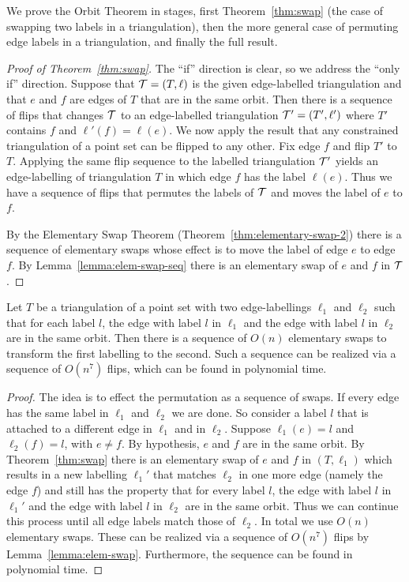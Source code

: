 We prove the Orbit Theorem in stages, first Theorem~\ref{thm:swap} (the case of swapping two labels in a triangulation),
then the more general case of permuting edge labels in a triangulation, and finally the full result.

\begin{proof}[Proof of Theorem~\ref{thm:swap}] 
The ``if'' direction is clear, so we address the ``only if'' direction.
Suppose that ${\cal T} = (T, \ell)$ is the given edge-labelled triangulation and that 
$e$ and $f$ are edges of $T$ that are in the same orbit.  
Then
there is a sequence of flips that changes ${\cal T}$ to an edge-labelled triangulation ${\cal T}' = (T', \ell')$ where $T'$  contains $f$ and $\ell'(f) = \ell(e)$.  
We now apply the result that any constrained triangulation of a point set can be flipped to any other.
Fix edge $f$ and flip $T'$ to $T$.  
Applying the same flip sequence to the labelled triangulation ${\cal T}'$ yields an edge-labelling of triangulation $T$ in which edge $f$ has the label $\ell(e)$.  Thus we have a sequence of flips that permutes the labels of $\cal T$ and moves the label of $e$ to $f$.

By the Elementary Swap Theorem (Theorem~\ref{thm:elementary-swap-2}) there is a sequence of elementary swaps whose effect is to move the label of edge $e$ to edge $f$.  
By Lemma~\ref{lemma:elem-swap-seq} there is an elementary swap of $e$ and $f$ in $\cal T$. 
 \end{proof}



\begin{theorem}
\label{thm:strong-permutation}
Let $T$ be a triangulation of a point set with two edge-labellings $\ell_1$ and $\ell_2$ such that for each label $l$, the edge with label $l$ in $\ell_1$ and the edge with label $l$ in $\ell_2$ are in the same orbit.  Then there is a sequence of $O(n)$ elementary swaps to transform the first labelling to the second.  
Such a sequence can be realized via a sequence of $O(n^7)$ flips, which can be found in polynomial time.
\end{theorem}
\begin{proof}
The idea is to effect the permutation as a sequence of swaps. 
If every edge has the same label in $\ell_1$ and $\ell_2$ we are done.   
So consider a label $l$ that is attached to a different edge in $\ell_1$ and in $\ell_2$.
Suppose $\ell_1(e) = l$ and $\ell_2(f) = l$, with $e \ne f$.
By hypothesis, $e$ and $f$ are in the same orbit.  
By Theorem~\ref{thm:swap} there is an  elementary swap of $e$ and $f$ in $(T, \ell_1)$ which results in a new labelling $\ell_1'$ that matches $\ell_2$ in one more edge (namely the edge $f$) and still has the property that for every label $l$, the edge with label $l$ in  $\ell_1'$ and the edge with label $l$ in $\ell_2$ are in the same orbit.  
Thus we can continue this process until all edge labels match those of $\ell_2$.
In total we use $O(n)$ elementary swaps. These can be realized via a sequence of $O(n^7)$ flips by Lemma~\ref{lemma:elem-swap}.   Furthermore, the sequence can be found in polynomial time.  
\end{proof}

